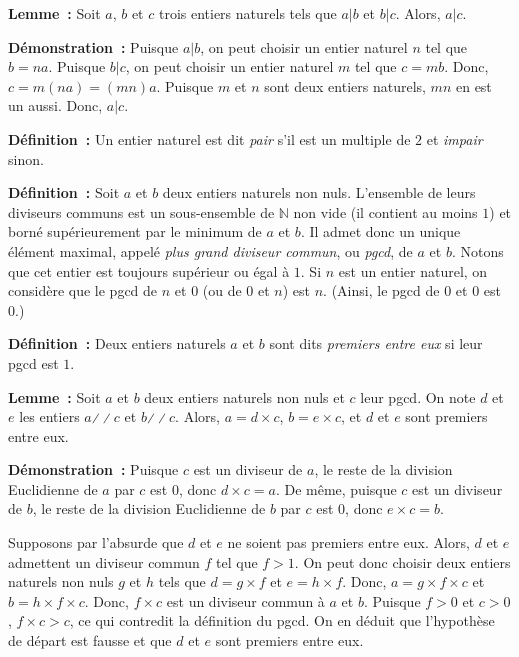 \medskip

\noindent\textbf{Lemme :} 
    Soit $a$, $b$ et $c$ trois entiers naturels tels que $a \vert b$ et $b \vert c$.
    Alors, $a \vert c$.

\medskip

\noindent\textbf{Démonstration :}
    Puisque $a \vert b$, on peut choisir un entier naturel $n$ tel que $b = n a$.
    Puisque $b \vert c$, on peut choisir un entier naturel $m$ tel que $c = m b$.
    Donc, $c = m (n a) = (m n) a$.
    Puisque $m$ et $n$ sont deux entiers naturels, $m n$ en est un aussi.
    Donc, $a \vert c$.

    \done

\medskip

\noindent\textbf{Définition :} Un entier naturel est dit \textit{pair} s'il est un multiple de $2$ et \textit{impair} sinon. 

\medskip

\noindent\textbf{Définition :} Soit $a$ et $b$ deux entiers naturels non nuls. L'ensemble de leurs diviseurs communs est un sous-ensemble de $\mathbb{N}$ non vide (il contient au moins $1$) et borné supérieurement par le minimum de $a$ et $b$. Il admet donc un unique élément maximal, appelé \textit{plus grand diviseur commun}, ou \textit{pgcd}, de $a$ et $b$. 
    Notons que cet entier est toujours supérieur ou égal à $1$. 
    Si $n$ est un entier naturel, on considère que le pgcd de $n$ et $0$ (ou de $0$ et $n$) est $n$.
    (Ainsi, le pgcd de $0$ et $0$ est $0$.)

\medskip

\noindent\textbf{Définition :} Deux entiers naturels $a$ et $b$ sont dits \textit{premiers entre eux} si leur pgcd est $1$.

\medskip

\noindent\textbf{Lemme :} Soit $a$ et $b$ deux entiers naturels non nuls et $c$ leur pgcd.
    On note $d$ et $e$ les entiers $a \mathrel{\divslash\!\divslash} c$ et $b \mathrel{\divslash\!\divslash} c$. 
    Alors, $a = d \times c$, $b = e \times c$, et $d$ et $e$ sont premiers entre eux.

\medskip

\noindent\textbf{Démonstration :} 
    Puisque $c$ est un diviseur de $a$, le reste de la division Euclidienne de $a$ par $c$ est $0$, donc $d \times c = a$.
    De même, puisque $c$ est un diviseur de $b$, le reste de la division Euclidienne de $b$ par $c$ est $0$, donc $e \times c = b$.

    Supposons par l'absurde que $d$ et $e$ ne soient pas premiers entre eux. 
    Alors, $d$ et $e$ admettent un diviseur commun $f$ tel que $f > 1$.
    On peut donc choisir deux entiers naturels non nuls $g$ et $h$ tels que $d = g \times f$ et $e = h \times f$.
    Donc, $a = g \times f \times c$ et $b = h \times f \times c$. 
    Donc, $f \times c$ est un diviseur commun à $a$ et $b$. 
    Puisque $f > 0$ et $c > 0$, $f \times c > c$, ce qui contredit la définition du pgcd. 
    On en déduit que l'hypothèse de départ est fausse et que $d$ et $e$ sont premiers entre eux. 

